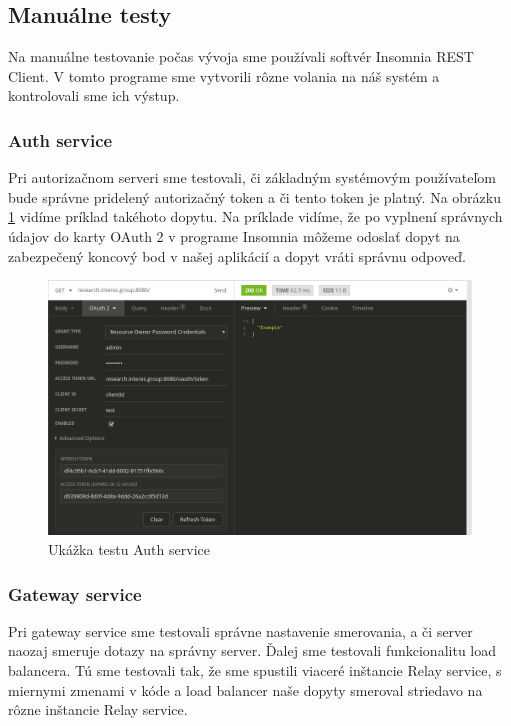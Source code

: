 \subsection{Manuálne testy}

Na manuálne testovanie počas vývoja sme používali softvér Insomnia REST Client\cite{insomnia}. V tomto programe sme vytvorili rôzne volania na náš systém a kontrolovali sme ich výstup.

\subsubsection{Auth service}
Pri autorizačnom serveri sme testovali, či základným systémovým používateľom bude správne pridelený autorizačný token a či tento token je platný. Na obrázku \ref{insomnia_oauth} vidíme príklad takéhoto dopytu. Na príklade vidíme, že po vyplnení správnych údajov do karty OAuth 2 v programe Insomnia môžeme odoslať dopyt na zabezpečený koncový bod v našej aplikácií a dopyt vráti správnu odpoveď.
\begin{figure}[!htbp]
	\centering
	\includegraphics[width=16cm]{img/insomnia_oauth.png}
	\caption{Ukážka testu Auth service}
	\label{insomnia_oauth}
\end{figure}

\subsubsection{Gateway service}
Pri gateway service sme testovali správne nastavenie smerovania, a či server naozaj smeruje dotazy na správny server. Ďalej sme testovali funkcionalitu load balancera. Tú sme testovali tak, že sme spustili viaceré inštancie Relay service, s miernymi zmenami v kóde a load balancer naše dopyty smeroval striedavo na rôzne inštancie Relay service.

